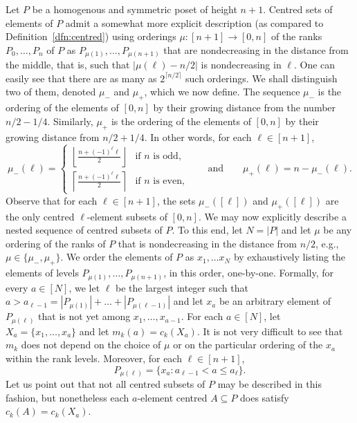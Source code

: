 \documentclass[11pt,a4paper,reqno]{amsart}
\numberwithin{claim}{thm}
\theoremstyle{definition}
\newcommand{\mum}{\mu_-}
\newcommand{\mup}{\mu_+}
\renewcommand{\le}{\leqslant}
\begin{document}
Let $P$ be a homogenous and symmetric poset of height $n+1$. Centred sets of elements of $P$ admit a somewhat more explicit description (as compared to Definition~\ref{dfn:centred}) using orderings $\mu \colon [n+1] \to [0, n]$ of the ranks $P_0, \dotsc, P_n$ of $P$ as $P_{\mu(1)}, \dotsc, P_{\mu(n+1)}$ that are nondecreasing in the distance from the middle, that is, such that $|\mu(\ell) - n/2|$ is nondecreasing in $\ell$. One can easily see that there are as many as $2^{\lceil n/2 \rceil}$ such orderings. We shall distinguish two of them, denoted $\mum$ and $\mup$, which we now define. The sequence $\mum$ is the ordering of the elements of $[0, n]$ by their growing distance from the number $n/2-1/4$. Similarly, $\mup$ is the ordering of the elements of $[0, n]$ by their growing distance from $n/2+1/4$. In other words, for each $\ell \in [n+1]$,
\[
  \mum(\ell) =
  \begin{cases}
    \left\lfloor\frac{n+(-1)^\ell \ell}{2}\right\rfloor & \text{if $n$ is odd,} \\
    \left\lceil\frac{n+(-1)^\ell \ell}{2}\right\rceil & \text{if $n$ is even,}
  \end{cases}
  \qquad
  \text{and}
  \qquad
  \mup(\ell) = n - \mum(\ell).
\]
Observe that for each $\ell \in [n+1]$, the sets $\mum([\ell])$ and $\mup([\ell])$ are the only centred $\ell$-element subsets of $[0, n]$. We may now explicitly describe a nested sequence of centred subsets of $P$. To this end, let $N = |P|$ and let $\mu$ be any ordering of the ranks of $P$ that is nondecreasing in the distance from $n/2$, e.g., $\mu \in \{\mum, \mup\}$. We order the elements of $P$ as $x_1, \dotsc x_N$ by exhaustively listing the elements of levels $P_{\mu(1)}, \dotsc, P_{\mu(n+1)}$, in this order, one-by-one. Formally, for every $a \in [N]$, we let $\ell$ be the largest integer such that $a > a_{\ell-1} = |P_{\mu(1)}| + \dotsc + |P_{\mu(\ell-1)}|$ and let $x_a$ be an arbitrary element of $P_{\mu(\ell)}$ that is not yet among $x_1, \dotsc, x_{a-1}$. For each $a \in [N]$, let $X_a = \{x_1, \dotsc, x_a\}$ and let $m_k(a) = c_k(X_a)$. It is not very difficult to see that $m_k$ does not depend on the choice of $\mu$ or on the particular ordering of the $x_a$ within the rank levels. Moreover, for each $\ell \in [n+1]$,
\[
  P_{\mu(\ell)} = \{x_a \colon a_{\ell-1} < a \le a_\ell \}.
\]
Let us point out that not all centred subsets of $P$ may be described in this fashion, but nonetheless each $a$-element centred $A \subseteq P$ does satisfy $c_k(A) = c_k(X_a)$.
\end{document}
